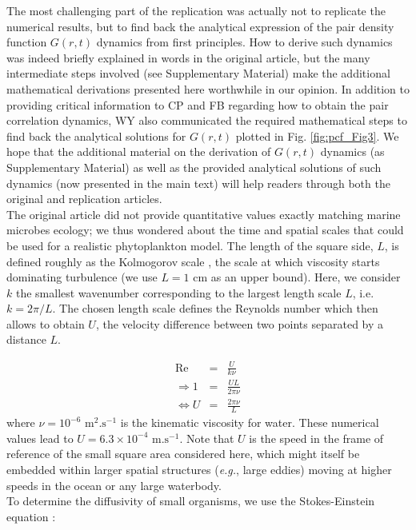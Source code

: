 The most challenging part of the replication was actually not to replicate the numerical results, but to find back the analytical expression of the pair density function $G(r,t)$ dynamics from first principles. How to derive such dynamics was indeed briefly explained in words in the original article, but the many intermediate steps involved (see Supplementary Material) make the additional mathematical derivations presented here worthwhile in our opinion. In addition to providing critical information to CP and FB regarding how to obtain the pair correlation dynamics, WY also communicated the required mathematical steps to find back the analytical solutions for $G(r,t)$ plotted in Fig. \ref{fig:pcf_Fig3}. We hope that the additional material on the derivation of $G(r,t)$ dynamics (as Supplementary Material) as well as the provided analytical solutions of such dynamics (now presented in the main text) will help readers through both the original and replication articles. \\

The original article did not provide quantitative values exactly matching marine microbes ecology; we thus wondered about the time and spatial scales that could be used for a realistic phytoplankton model. The length of the square side, $L$, is defined roughly as the Kolmogorov scale \citep{tennekes1972first}, the scale at which viscosity starts dominating turbulence  (we use $L= 1$ cm as an upper bound). Here, we consider $k$ the smallest wavenumber corresponding to the largest length scale $L$, i.e. $k=2\pi/L$. The chosen length scale defines the Reynolds number which then allows to obtain $U$, the velocity difference between two points separated by a distance $L$.  
 
\begin{eqnarray}
 \text{Re} & = &\frac{U}{k\nu}\\
\Rightarrow 1 & = & \frac{UL}{2\pi\nu}\\
\Leftrightarrow U & = &\frac{2\pi\nu}{L}
\end{eqnarray}
% 
where $\nu=10^{-6} \text{ m}^{2}.\text{s}^{-1}$ is the kinematic viscosity for water. These numerical values lead to $U=6.3\times10^{-4} \text{ m.s}^{-1}$. Note that $U$ is the speed in the frame of reference of the small square area considered here, which might itself be embedded within larger spatial structures (\textit{e.g.}, large eddies) moving at higher speeds in the ocean or any large waterbody.\\

To determine the diffusivity of small organisms, we use the Stokes-Einstein equation \citep{einstein1905molekularkinetischen}:


